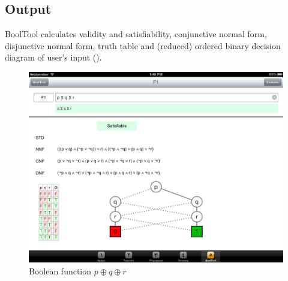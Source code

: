 \subsection{Output}

BoolTool calculates validity and satisfiability, 
conjunctive normal form, 
disjunctive normal form, 
truth table and 
(reduced) ordered binary decision diagram 
of user's input (). 

\begin{figure}[htbp]
\begin{center}
\includegraphics[width=13cm]{concept/BoolTool.png}
\caption{Boolean function $p \oplus q \oplus r$}
\label{fig:BoolToolOutput}
\end{center}
\end{figure}



